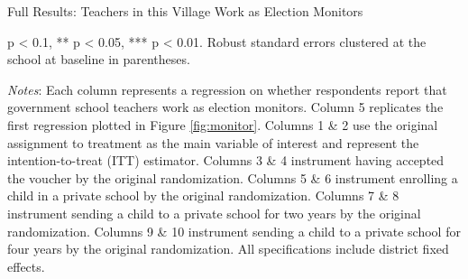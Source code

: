 \documentclass[hidelinks, 12pt, titlepage]{article}
\begin{document}
				\begin{landscape}

				\begin{table}
					\begin{threeparttable}
						\centering
						\caption{Full Results: Teachers in this Village Work as Election Monitors\label{table:appendixelectionmonitors}}
						
						\begin{tablenotes}
							\item * p < 0.1, ** p < 0.05, *** p < 0.01. Robust standard errors clustered at the school at baseline in parentheses.
							\item \emph{Notes}: Each column represents a regression on whether respondents report that government school teachers work as election monitors.  Column 5 replicates the first regression plotted in Figure \ref{fig:monitor}.  Columns 1 \& 2 use the original assignment to treatment as the main variable of interest and represent the intention-to-treat (ITT) estimator.  Columns 3 \& 4 instrument having accepted the voucher by the original randomization.  Columns 5 \& 6 instrument enrolling a child in a private school by the original randomization.  Columns 7 \& 8 instrument sending a child to a private school for two years by the original randomization.  Columns 9 \& 10 instrument sending a child to a private school for four years by the original randomization.  All specifications include district fixed effects.
						\end{tablenotes}
					\end{threeparttable}
				\end{table}

				\clearpage


\end{landscape}
\end{document}
